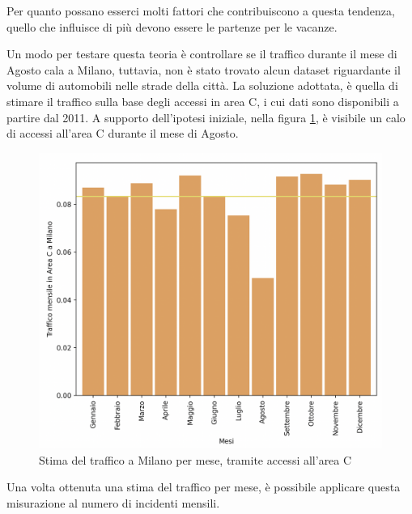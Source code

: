 \documentclass[a4paper]{report}
\begin{document}
Per quanto possano esserci molti fattori che contribuiscono a questa tendenza, 
quello che influisce di più devono essere le partenze per le vacanze.

Un modo per testare questa teoria è controllare se il traffico durante il mese di Agosto cala a Milano, 
tuttavia, non è stato trovato alcun dataset riguardante il volume di automobili nelle strade della città.
La soluzione adottata, è quella di stimare il traffico sulla base degli accessi in area C, i cui dati 
sono disponibili a partire dal 2011.
A supporto dell'ipotesi iniziale, nella figura \ref{fig:stima-traffico-mensile}, 
è visibile un calo di accessi all'area C durante il mese di Agosto.

\begin{figure}
    \includegraphics[width=\linewidth]{../src/area_c/stima_traffico_mensile.png}
    \caption{Stima del traffico a Milano per mese, tramite accessi all'area C}
    \label{fig:stima-traffico-mensile}
\end{figure}

Una volta ottenuta una stima del traffico per mese, è possibile applicare questa misurazione 
al numero di incidenti mensili.
\end{document}
